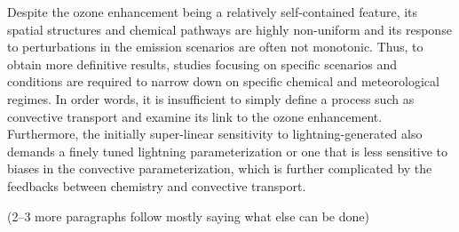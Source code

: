 Despite the ozone enhancement being a relatively self-contained feature, its spatial structures
and chemical pathways are highly non-uniform and its response to perturbations in the emission
scenarios are often not monotonic. Thus, to obtain more definitive results, studies
focusing on specific scenarios and conditions are required to narrow down on specific chemical
and meteorological regimes. In order words, it is insufficient to simply define a process such as
convective transport and examine its link to the ozone enhancement. Furthermore, the initially
super-linear sensitivity to lightning-generated  also demands a finely tuned lightning
parameterization or one that is less sensitive to biases in the convective parameterization, which
is further complicated by the feedbacks between chemistry and convective transport.

(2--3 more paragraphs follow mostly saying what else can be done)